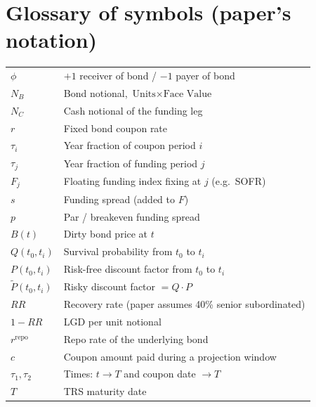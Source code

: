 \documentclass[11pt,a4paper]{article}
\begin{document}
\section{Glossary of symbols (paper's notation)}
\begin{tabular}{@{}p{3cm}p{12cm}@{}}
\toprule
$\phi$                & $+1$ receiver of bond / $-1$ payer of bond \\
$N_B$                 & Bond notional, $\text{Units} \times \text{Face Value}$ \\
$N_C$                 & Cash notional of the funding leg \\
$r$                   & Fixed bond coupon rate \\
$\tau_i$              & Year fraction of coupon period $i$ \\
$\tau_j$              & Year fraction of funding period $j$ \\
$F_j$                 & Floating funding index fixing at $j$ (e.g.\ SOFR) \\
$s$                   & Funding spread (added to $F$) \\
$p$                   & Par / breakeven funding spread \\
$B(t)$                & Dirty bond price at $t$ \\
$Q(t_0, t_i)$         & Survival probability from $t_0$ to $t_i$ \\
$P(t_0, t_i)$         & Risk-free discount factor from $t_0$ to $t_i$ \\
$\widetilde P(t_0, t_i)$ & Risky discount factor $= Q \cdot P$ \\
$RR$                  & Recovery rate (paper assumes 40\% senior subordinated) \\
$1 - RR$              & LGD per unit notional \\
$r^{\text{repo}}$     & Repo rate of the underlying bond \\
$c$                   & Coupon amount paid during a projection window \\
$\tau_1, \tau_2$      & Times: $t \to T$ and coupon date $\to T$ \\
$T$                   & TRS maturity date \\
\bottomrule
\end{tabular}
\end{document}
